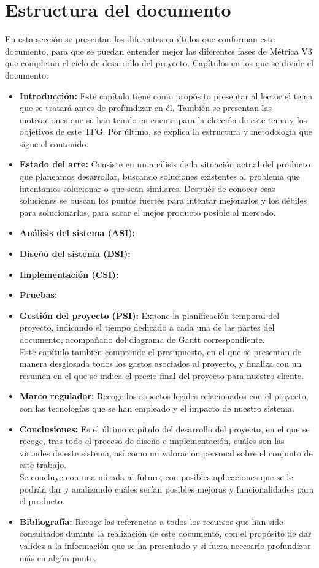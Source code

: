 \section{Estructura del documento}
En esta sección se presentan los diferentes capítulos que conforman este documento, para que se puedan entender mejor las diferentes fases de Métrica V3 que completan el ciclo de desarrollo del proyecto. Capítulos en los que se divide el documento:

\begin{itemize}
    \item \textbf{Introducción:} Este capítulo tiene como propósito presentar al lector el tema que se tratará antes de profundizar en él. También se presentan las motivaciones que se han tenido en cuenta para la elección de este tema y los objetivos de este TFG. Por último, se explica la estructura y metodología que sigue el contenido. 
    \item \textbf{Estado del arte:} Consiste en un análisis de la situación actual del producto que planeamos desarrollar, buscando soluciones existentes al problema que intentamos solucionar o que sean similares. Después de conocer esas soluciones se buscan los puntos fuertes para intentar mejorarlos y los débiles para solucionarlos, para sacar el mejor producto posible al mercado.
    \item \textbf{Análisis del sistema (ASI):}
    \item \textbf{Diseño del sistema (DSI):}
    \item \textbf{Implementación (CSI):}
    \item \textbf{Pruebas:}
    \item \textbf{Gestión del proyecto (PSI):} Expone la planificación temporal del proyecto, indicando el tiempo dedicado a cada una de las partes del documento, acompañado del diagrama de Gantt correspondiente. \\ Este capítulo también comprende el presupuesto, en el que se presentan de manera desglosada todos los gastos asociados al proyecto, y finaliza con un resumen en el que se indica el precio final del proyecto para nuestro cliente.
    \item \textbf{Marco regulador:} Recoge los aspectos legales relacionados con el proyecto, con las tecnologías que se han empleado y el impacto de nuestro sistema.
    \item \textbf{Conclusiones:} Es el último capítulo del desarrollo del proyecto, en el que se recoge, tras todo el proceso de diseño e implementación, cuáles son las virtudes de este sistema, así como mi valoración personal sobre el conjunto de este trabajo. \\ Se concluye con una mirada al futuro, con posibles aplicaciones que se le podrán dar y analizando cuáles serían posibles mejoras y funcionalidades para el producto. 
    \item \textbf{Bibliografía:} Recoge las referencias a todos los recursos que han sido consultados durante la realización de este documento, con el propósito de dar validez a la información que se ha presentado y si fuera necesario profundizar más en algún punto.
\end{itemize}